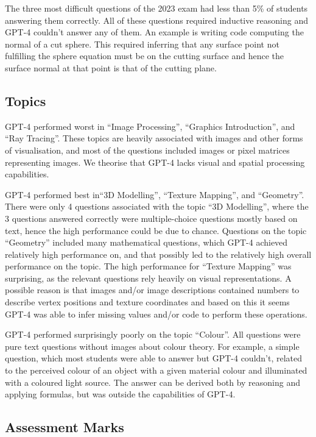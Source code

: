 \documentclass[sigconf,review]{acmart}
\begin{document}
The three most difficult questions of the 2023 exam had less than 5\% of students answering them correctly. All of these questions required inductive reasoning and GPT-4 couldn't answer any of them. An example is writing code computing the normal of a cut sphere. This required inferring that any surface point not fulfilling the sphere equation must be on the cutting surface and hence the surface normal at that point is that of the cutting plane.

\subsection{Topics}

GPT-4 performed worst in ``Image Processing'', ``Graphics Introduction'', and ``Ray Tracing''. These topics are heavily associated with images and other forms of visualisation, and most of the questions included images or pixel matrices representing images. We theorise that GPT-4 lacks visual and spatial processing capabilities.

GPT-4 performed best in``3D Modelling'', ``Texture Mapping'', and ``Geometry''. There were only 4 questions associated with the topic ``3D Modelling'', where the 3 questions answered correctly were multiple-choice questions mostly based on text, hence the high performance could be due to chance. Questions on the topic ``Geometry'' included many mathematical questions, which GPT-4 achieved relatively high performance on, and that possibly led to the relatively high overall performance on the topic. The high performance for ``Texture Mapping'' was surprising, as the relevant questions rely heavily on visual representations. A possible reason is that images and/or image descriptions contained numbers to describe vertex positions and texture coordinates and based on this it seems GPT-4 was able to infer missing values and/or code to perform these operations.

GPT-4 performed surprisingly poorly on the topic ``Colour''. All questions were pure text questions without images about colour theory. For example, a simple question, which most students were able to answer but GPT-4 couldn't, related to the perceived colour of an object with a given material colour and illuminated with a coloured light source. The answer can be derived both by reasoning and applying formulas, but was outside the capabilities of GPT-4.

\subsection{Assessment Marks}
\end{document}
